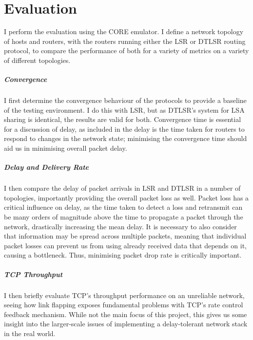 \documentclass[withindex,glossary,openany]{cam-thesis}
\begin{document}
\chapter{Evaluation}
\label{chapter:evaluation}

I perform the evaluation using the CORE emulator. I define a network topology of hosts and routers, with the routers running either the LSR or DTLSR routing protocol, to compare the performance of both for a variety of metrics on a variety of different topologies.

\paragraph{Convergence}
I first determine the convergence behaviour of the protocols to provide a baseline of the testing environment. I do this with LSR, but as DTLSR's system for LSA sharing is identical, the results are valid for both. Convergence time is essential for a discussion of delay, as included in the delay is the time taken for routers to respond to changes in the network state; minimising the convergence time should aid us in minimising overall packet delay.


\paragraph{Delay and Delivery Rate}
I then compare the delay of packet arrivals in LSR and DTLSR in a number of topologies, importantly providing the overall packet loss as well. Packet loss has a critical influence on delay, as the time taken to detect a loss and retransmit can be many orders of magnitude above the time to propagate a packet through the network, drastically increasing the mean delay. It is necessary to also consider that information may be spread across multiple packets, meaning that individual packet losses can prevent us from using already received data that depends on it, causing a bottleneck. Thus, minimising packet drop rate is critically important.

\paragraph{TCP Throughput}
I then briefly evaluate TCP's throughput performance on an unreliable network, seeing how link flapping exposes fundamental problems with TCP's rate control feedback mechanism. While not the main focus of this project, this gives us some insight into the larger-scale issues of implementing a delay-tolerant network stack in the real world.
\end{document}
